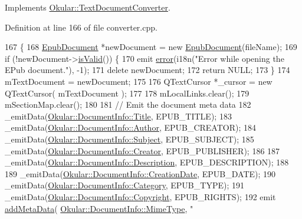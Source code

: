 Implements \hyperlink{classOkular_1_1TextDocumentConverter_ad05f8bcde0f347c6292968fab331bcef}{Okular\+::\+Text\+Document\+Converter}.



Definition at line 166 of file converter.\+cpp.


\begin{DoxyCode}
167 \{
168   \hyperlink{classEpub_1_1EpubDocument}{EpubDocument} *newDocument = \textcolor{keyword}{new} \hyperlink{classEpub_1_1EpubDocument}{EpubDocument}(fileName);
169   \textcolor{keywordflow}{if} (!newDocument->\hyperlink{classEpub_1_1EpubDocument_ad47e936fccea93a28d1ebb0cf3b36624}{isValid}()) \{
170     emit \hyperlink{classOkular_1_1TextDocumentConverter_a93f1335bdd8232626364c973d9d7e6b4}{error}(i18n(\textcolor{stringliteral}{"Error while opening the EPub document."}), -1);
171     \textcolor{keyword}{delete} newDocument;
172     \textcolor{keywordflow}{return} NULL;
173   \}
174   mTextDocument = newDocument;
175 
176   QTextCursor *\_cursor = \textcolor{keyword}{new} QTextCursor( mTextDocument );
177 
178   mLocalLinks.clear();
179   mSectionMap.clear();
180 
181   \textcolor{comment}{// Emit the document meta data}
182   \_emitData(\hyperlink{classOkular_1_1DocumentInfo_a3a6e5f7fb246e29bcb2e830b6f770791ae400626d63f14b61c55bd22aca9481e0}{Okular::DocumentInfo::Title}, EPUB\_TITLE);
183   \_emitData(\hyperlink{classOkular_1_1DocumentInfo_a3a6e5f7fb246e29bcb2e830b6f770791a1010574d070b1925e030c20fef3e7a35}{Okular::DocumentInfo::Author}, EPUB\_CREATOR);
184   \_emitData(\hyperlink{classOkular_1_1DocumentInfo_a3a6e5f7fb246e29bcb2e830b6f770791a19478a99f97624500aa2d050fe7e1ad8}{Okular::DocumentInfo::Subject}, EPUB\_SUBJECT);
185   \_emitData(\hyperlink{classOkular_1_1DocumentInfo_a3a6e5f7fb246e29bcb2e830b6f770791ab361aa9681b157d8d81e52f440bf646f}{Okular::DocumentInfo::Creator}, EPUB\_PUBLISHER);
186 
187   \_emitData(\hyperlink{classOkular_1_1DocumentInfo_a3a6e5f7fb246e29bcb2e830b6f770791acc3edf1d2abe6eecb0882f4389475591}{Okular::DocumentInfo::Description}, EPUB\_DESCRIPTION);
188 
189   \_emitData(\hyperlink{classOkular_1_1DocumentInfo_a3a6e5f7fb246e29bcb2e830b6f770791a58a72aeacd3cb08e85d0f9f19b2fe83a}{Okular::DocumentInfo::CreationDate}, EPUB\_DATE);
190   \_emitData(\hyperlink{classOkular_1_1DocumentInfo_a3a6e5f7fb246e29bcb2e830b6f770791a1c5f3f7912efdbeff34d16608375c97a}{Okular::DocumentInfo::Category}, EPUB\_TYPE);
191   \_emitData(\hyperlink{classOkular_1_1DocumentInfo_a3a6e5f7fb246e29bcb2e830b6f770791a54b1ae59c56cd90e64b518e4d729471a}{Okular::DocumentInfo::Copyright}, EPUB\_RIGHTS);
192   emit \hyperlink{classOkular_1_1TextDocumentConverter_ad6e263857527273c9cf618e16329f6a7}{addMetaData}( \hyperlink{classOkular_1_1DocumentInfo_a3a6e5f7fb246e29bcb2e830b6f770791a786464e8e8c3e6ba1cd74e408487785b}{Okular::DocumentInfo::MimeType}, \textcolor{stringliteral}{"
}
\end{DoxyCode}
